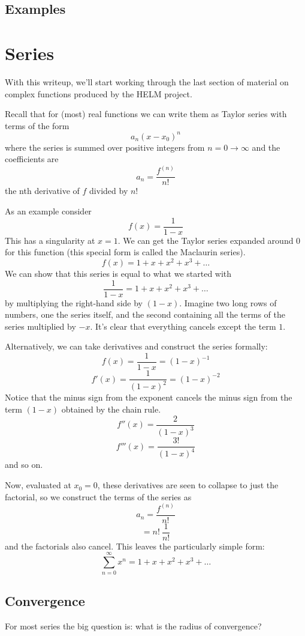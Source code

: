 \documentclass[11pt, oneside]{article}   	%
\begin{document}
\subsection*{Examples}


\section{Series}
With this writeup, we'll start working through the last section of material on complex functions produced by the HELM project.

Recall that for (most) real functions we can write them as Taylor series with terms of the form
\[ a_n (x-x_0)^n \] 
where the series is summed over positive integers from $n = 0 \rightarrow \infty$ and the coefficients are
\[ a_n = \frac{f^{(n)}}{n!} \]
the nth derivative of $f$ divided by $n!$

As an example consider
\[ f(x) = \frac{1}{1 - x} \]
This has a singularity at $x = 1$.  We can get the Taylor series expanded around $0$ for this function (this special form is called the Maclaurin series).
\[ f(x) = 1 + x + x^2 + x^3 + \dots \]
We can show that this series is equal to what we started with
\[ \frac{1}{1 - x} = 1 + x + x^2 + x^3 + \dots \]
by multiplying the right-hand side by $(1-x)$.  Imagine two long rows of numbers, one the series itself, and the second containing all the terms of the series multiplied by $-x$.  It's clear that everything cancels except the term $1$.

Alternatively, we can take derivatives and construct the series formally:
\[ f(x) = \frac{1}{1 - x} = (1-x)^{-1} \]
\[ f'(x) = \frac{1}{(1 - x)^2} = (1-x)^{-2} \]
Notice that the minus sign from the exponent cancels the minus sign from the term $(1-x)$ obtained by the chain rule.  
\[ f''(x) = \frac{2}{(1 - x)^3} \]
\[ f'''(x) = \frac{3!}{(1 - x)^4} \]
and so on.

Now, evaluated at $x_0 = 0$, these derivatives are seen to collapse to just the factorial, so we construct the terms of the series as
\[ a_n = \frac{f^{(n)}}{n!} \]
\[ = n! \ \frac{1}{n!} \]
and the factorials also cancel.  This leaves the particularly simple form:
\[ \sum_{n=0}^{\infty} x^n = 1 + x + x^2 + x^3 + \dots \]

\subsection*{Convergence}
For most series the big question is:  what is the radius of convergence?
\end{document}
